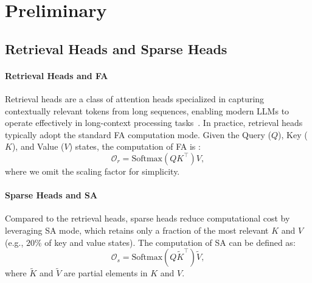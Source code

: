 \section{Preliminary}
\label{sec:preliminary}


\subsection{Retrieval Heads and Sparse Heads}
\label{subsec:attn_mechanism}

\paragraph{Retrieval Heads and FA}
Retrieval heads are a class of attention heads specialized in capturing contextually relevant tokens from long sequences, enabling modern LLMs to operate effectively in long-context processing tasks~\citep{wu2024retrieval}.
In practice, retrieval heads typically adopt the standard FA computation mode.
Given the Query ($Q$), Key ($K$), and Value ($V$) states, the computation of FA is :
\begin{equation}
\mathcal{O}_{r}=\mathrm{Softmax}\!\left(QK^{\top}\right)V,
\label{equ:dot_attention}
\end{equation}
where we omit the scaling factor for simplicity.

\paragraph{Sparse Heads and SA}
Compared to the retrieval heads, sparse heads reduce computational cost by leveraging SA mode, which retains only a fraction of the most relevant $K$ and $V$ (e.g., $20\%$ of key and value states).
The computation of SA can be defined as:
\begin{equation}
\mathcal{O}_{s}=\mathrm{Softmax}\!\left(Q\tilde{K}^{\top}\right)\tilde{V},
\label{equ:sparse_attention}
\end{equation}
where $\tilde{K}$ and $\tilde{V}$ are partial elements in $K$ and $V$.

